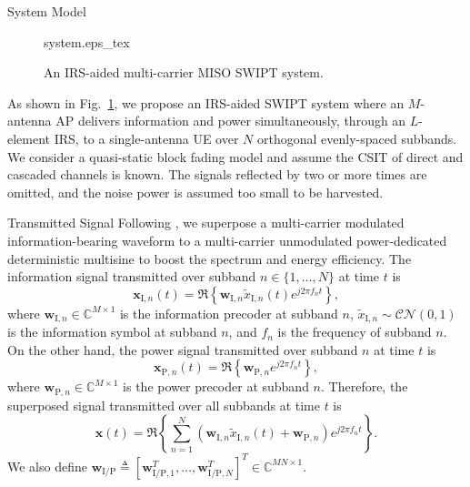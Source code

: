 \documentclass[journal]{IEEEtran}
\begin{document}
	\begin{section}{System Model}\label{se:system_model}
		\begin{figure}[!t]
			\centering
			\def\svgwidth{0.9\columnwidth}
			{system.eps_tex}
			\caption{An IRS-aided multi-carrier MISO SWIPT system.}
			\label{fi:system}
		\end{figure}

		As shown in Fig.~\ref{fi:system}, we propose an IRS-aided SWIPT system where an $M$-antenna AP delivers information and power simultaneously, through an $L$-element IRS, to a single-antenna UE over $N$ orthogonal evenly-spaced subbands. We consider a quasi-static block fading model and assume the CSIT of direct and cascaded channels is known. The signals reflected by two or more times are omitted, and the noise power is assumed too small to be harvested.


		\begin{subsection}{Transmitted Signal}
			Following \cite{Clerckx2018b}, we superpose a multi-carrier modulated information-bearing waveform to a multi-carrier unmodulated power-dedicated deterministic multisine to boost the spectrum and energy efficiency. The information signal transmitted over subband $n \in \{1, \dots, N\}$ at time $t$ is
			\begin{equation}
				\boldsymbol{x}_{\mathrm{I},n}(t) = \Re\left\{\boldsymbol{w}_{\mathrm{I},n} \tilde{x}_{\mathrm{I},n}(t) e^{j2{\pi}{f_n}{t}}\right\},
			\end{equation}
			where $\boldsymbol{w}_{\mathrm{I},n} \in \mathbb{C}^{M \times 1}$ is the information precoder at subband $n$, $\tilde{x}_{\mathrm{I},n}\sim\mathcal{CN}(0,1)$ is the information symbol at subband $n$, and $f_n$ is the frequency of subband $n$. On the other hand, the power signal transmitted over subband $n$ at time $t$ is
			\begin{equation}
				\boldsymbol{x}_{\mathrm{P},n}(t) = \Re\left\{\boldsymbol{w}_{\mathrm{P},n} e^{j2{\pi}{f_n}{t}}\right\},
			\end{equation}
			where $\boldsymbol{w}_{\mathrm{P},n} \in \mathbb{C}^{M \times 1}$ is the power precoder at subband $n$. Therefore, the superposed signal transmitted over all subbands at time $t$ is
			\begin{equation}
				\boldsymbol{x}(t) = \Re{\left\{\sum_{n=1}^N(\boldsymbol{w}_{\mathrm{I},n}\tilde{x}_{\mathrm{I},n}(t)+\boldsymbol{w}_{\mathrm{P},n}){e^{j2{\pi}{f_n}{t}}}\right\}}.
			\end{equation}
			We also define $\boldsymbol{w}_{\mathrm{I/P}} \triangleq [\boldsymbol{w}_{\mathrm{I/P},1}^T,\dots,\boldsymbol{w}_{\mathrm{I/P},N}^T]^T \in \mathbb{C}^{MN \times 1}$.
		\end{subsection}



\end{section}
\end{document}
